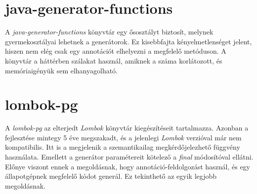 \documentclass[12pt, a4paper]{article}
\begin{document}
\section{java-generator-functions}
A \textit{java-generator-functions} könyvtár egy ősosztályt biztosít, melynek gyermekosztályai lehetnek a generátorok. Ez kisebbfajta kényelmetlenséget jelent, hiszen nem elég csak egy annotációt elhelyezni a megfelelő metóduson. A könyvtár a háttérben szálakat használ, amiknek a száma korlátozott, és memóriaigényük sem elhanyagolható.

\section{lombok-pg}
A \textit{lombok-pg} az elterjedt \textit{Lombok} könyvtár kiegészítéseit tartalmazza. Azonban a fejlesztése mintegy 5 éve megszakadt, és a jelenlegi \textit{Lombok} verzióval már nem kompatibilis. Itt is a megjelenik a szemantikailag megkérdőjelezhető függvény használata. Emellett a generátor paramétereit kötelező a \textit{final} módosítóval ellátni. Előnye viszont ennek a megoldásnak, hogy annotáció-feldolgozást használ, és egy állapotgépnek megfelelő kódot generál. Ez tekinthető az egyik legjobb megoldásnak.
\end{document}

